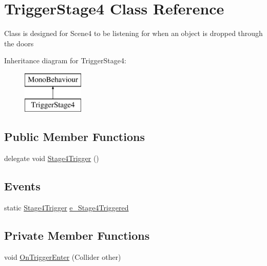\hypertarget{class_trigger_stage4}{}\section{Trigger\+Stage4 Class Reference}
\label{class_trigger_stage4}


Class is designed for Scene4 to be listening for when an object is dropped through the doors  


Inheritance diagram for Trigger\+Stage4\+:\begin{figure}[H]
\begin{center}
\leavevmode
\includegraphics[height=2.000000cm]{class_trigger_stage4}
\end{center}
\end{figure}
\subsection*{Public Member Functions}
\begin{DoxyCompactItemize}
\item 
delegate void \mbox{\hyperlink{class_trigger_stage4_a9b09ff6aa89d24158570596dc578bc0a}{Stage4\+Trigger}} ()
\end{DoxyCompactItemize}
\subsection*{Events}
\begin{DoxyCompactItemize}
\item 
static \mbox{\hyperlink{class_trigger_stage4_a9b09ff6aa89d24158570596dc578bc0a}{Stage4\+Trigger}} \mbox{\hyperlink{class_trigger_stage4_ac33c360701aebd4eeefcc2c63bdb8b19}{e\+\_\+\+Stage4\+Triggered}}
\end{DoxyCompactItemize}
\subsection*{Private Member Functions}
\begin{DoxyCompactItemize}
\item 
void \mbox{\hyperlink{class_trigger_stage4_a75b1f3045df85b380a4eebeed44fe217}{On\+Trigger\+Enter}} (Collider other)
\end{DoxyCompactItemize}


